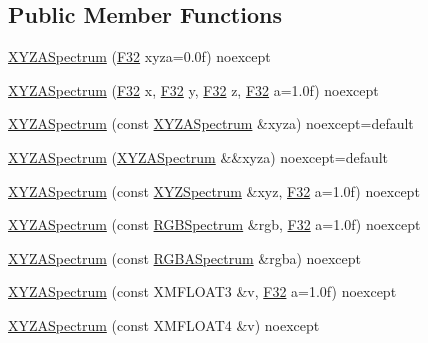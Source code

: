 \subsection*{Public Member Functions}
\begin{DoxyCompactItemize}
\item 
\hyperlink{structmage_1_1_x_y_z_a_spectrum_a5c9fd9e9a7feb1e2f2dff90241d666de}{X\+Y\+Z\+A\+Spectrum} (\hyperlink{namespacemage_aa97e833b45f06d60a0a9c4fc22ae02c0}{F32} xyza=0.\+0f) noexcept
\item 
\hyperlink{structmage_1_1_x_y_z_a_spectrum_a772c2eebb73043afa29ea8f5b8028080}{X\+Y\+Z\+A\+Spectrum} (\hyperlink{namespacemage_aa97e833b45f06d60a0a9c4fc22ae02c0}{F32} x, \hyperlink{namespacemage_aa97e833b45f06d60a0a9c4fc22ae02c0}{F32} y, \hyperlink{namespacemage_aa97e833b45f06d60a0a9c4fc22ae02c0}{F32} z, \hyperlink{namespacemage_aa97e833b45f06d60a0a9c4fc22ae02c0}{F32} a=1.\+0f) noexcept
\item 
\hyperlink{structmage_1_1_x_y_z_a_spectrum_ae088d21ba6cd6684b1347064570a5ff2}{X\+Y\+Z\+A\+Spectrum} (const \hyperlink{structmage_1_1_x_y_z_a_spectrum}{X\+Y\+Z\+A\+Spectrum} \&xyza) noexcept=default
\item 
\hyperlink{structmage_1_1_x_y_z_a_spectrum_a08e4635f76feced3cabc8a8c7289f036}{X\+Y\+Z\+A\+Spectrum} (\hyperlink{structmage_1_1_x_y_z_a_spectrum}{X\+Y\+Z\+A\+Spectrum} \&\&xyza) noexcept=default
\item 
\hyperlink{structmage_1_1_x_y_z_a_spectrum_a4c6548c1f2aa02a25e90d5331da75c63}{X\+Y\+Z\+A\+Spectrum} (const \hyperlink{structmage_1_1_x_y_z_spectrum}{X\+Y\+Z\+Spectrum} \&xyz, \hyperlink{namespacemage_aa97e833b45f06d60a0a9c4fc22ae02c0}{F32} a=1.\+0f) noexcept
\item 
\hyperlink{structmage_1_1_x_y_z_a_spectrum_a17ce26abe4841c9fd47875e0a5b8e8ec}{X\+Y\+Z\+A\+Spectrum} (const \hyperlink{structmage_1_1_r_g_b_spectrum}{R\+G\+B\+Spectrum} \&rgb, \hyperlink{namespacemage_aa97e833b45f06d60a0a9c4fc22ae02c0}{F32} a=1.\+0f) noexcept
\item 
\hyperlink{structmage_1_1_x_y_z_a_spectrum_ae415378258d5ee71b41a333d2f42f03d}{X\+Y\+Z\+A\+Spectrum} (const \hyperlink{structmage_1_1_r_g_b_a_spectrum}{R\+G\+B\+A\+Spectrum} \&rgba) noexcept
\item 
\hyperlink{structmage_1_1_x_y_z_a_spectrum_ae632ff687c6216cd0e732c1ab0f30a92}{X\+Y\+Z\+A\+Spectrum} (const X\+M\+F\+L\+O\+A\+T3 \&v, \hyperlink{namespacemage_aa97e833b45f06d60a0a9c4fc22ae02c0}{F32} a=1.\+0f) noexcept
\item 
\hyperlink{structmage_1_1_x_y_z_a_spectrum_a12e237f69939ca8b7ef30710a0520771}{X\+Y\+Z\+A\+Spectrum} (const X\+M\+F\+L\+O\+A\+T4 \&v) noexcept

\end{DoxyCompactItemize}
